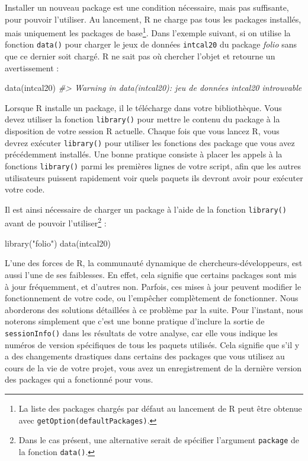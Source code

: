 \documentclass[
  french,
]{scrbook}
\newenvironment{Shaded}{\begin{snugshade}}{\end{snugshade}}
\newcommand{\CommentTok}[1]{\textcolor[rgb]{0.56,0.35,0.01}{\textit{#1}}}
\newcommand{\FunctionTok}[1]{\textcolor[rgb]{0.00,0.00,0.00}{#1}}
\newcommand{\NormalTok}[1]{#1}
\newcommand{\StringTok}[1]{\textcolor[rgb]{0.31,0.60,0.02}{#1}}
\begin{document}
Installer un nouveau package est une condition nécessaire, mais pas suffisante, pour pouvoir l'utiliser. Au lancement, R ne charge pas tous les packages installés, mais uniquement les packages de base\footnote{La liste des packages chargés par défaut au lancement de R peut être obtenue avec \texttt{getOption(\textquotesingle{}defaultPackages\textquotesingle{})}.}. Dans l'exemple suivant, si on utilise la fonction \texttt{data()} pour charger le jeux de données \texttt{intcal20} du package \emph{folio} sans que ce dernier soit chargé. R ne sait pas où chercher l'objet et retourne un avertissement :

\begin{Shaded}
\begin{Highlighting}[]
\FunctionTok{data}\NormalTok{(intcal20)}
\CommentTok{\#\textgreater{} Warning in data(intcal20): jeu de données \textquotesingle{}intcal20\textquotesingle{} introuvable}
\end{Highlighting}
\end{Shaded}

Lorsque R installe un package, il le télécharge dans votre bibliothèque. Vous devez utiliser la fonction \texttt{library()} pour mettre le contenu du package à la disposition de votre session R actuelle. Chaque fois que vous lancez R, vous devrez exécuter \texttt{library()} pour utiliser les fonctions des package que vous avez précédemment installés. Une bonne pratique consiste à placer les appels à la fonctions \texttt{library()} parmi les premières lignes de votre script, afin que les autres utilisateurs puissent rapidement voir quels paquets ils devront avoir pour exécuter votre code.

Il est ainsi nécessaire de charger un package à l'aide de la fonction \texttt{library()} avant de pouvoir l'utiliser\footnote{Dans le cas présent, une alternative serait de spécifier l'argument \texttt{package} de la fonction \texttt{data()}.} :

\begin{Shaded}
\begin{Highlighting}[]
\FunctionTok{library}\NormalTok{(}\StringTok{"folio"}\NormalTok{)}
\FunctionTok{data}\NormalTok{(intcal20)}
\end{Highlighting}
\end{Shaded}

L'une des forces de R, la communauté dynamique de chercheurs-développeurs, est aussi l'une de ses faiblesses. En effet, cela signifie que certains packages sont mis à jour fréquemment, et d'autres non. Parfois, ces mises à jour peuvent modifier le fonctionnement de votre code, ou l'empêcher complètement de fonctionner. Nous aborderons des solutions détaillées à ce problème par la suite. Pour l'instant, nous noterons simplement que c'est une bonne pratique d'inclure la sortie de \texttt{sessionInfo()} dans les résultats de votre analyse, car elle vous indique les numéros de version spécifiques de tous les paquets utilisés. Cela signifie que s'il y a des changements drastiques dans certains des packages que vous utilisez au cours de la vie de votre projet, vous avez un enregistrement de la dernière version des packages qui a fonctionné pour vous.
\end{document}
